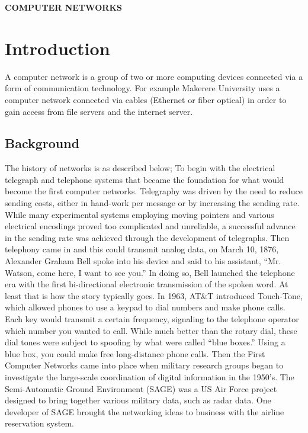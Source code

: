 ﻿\documentclass[10]{article}
\begin{document}
\begin{title}
\huge{\bfseries COMPUTER NETWORKS}
\end{title}
\author{BAMUZIBIRE SOLOMON MUKISA,14/U/3938/PS,214015782}
\section{Introduction}
A computer network is a group of two or more computing devices connected via a form of communication technology. For example Makerere University uses a computer network connected via cables (Ethernet or fiber optical) in order to gain access from file servers and the internet server.
\subsection{Background}
The history of networks is as described below;
To begin with the electrical telegraph and telephone systems that became the foundation for what would become the first computer networks. Telegraphy was driven by the need to reduce sending costs, either in hand-work per message or by increasing the sending rate. While many experimental systems employing moving pointers and various electrical encodings proved too complicated and unreliable, a successful advance in the sending rate was achieved through the development of telegraphs. Then telephony came in and this could transmit analog data, on March 10, 1876, Alexander Graham Bell spoke into his device and said to his assistant, “Mr. Watson, come here, I want to see you.” In doing so, Bell launched the telephone era with the first bi-directional electronic transmission of the spoken word. At least that is how the story typically goes. In 1963, AT&T introduced Touch-Tone, which allowed phones to use a keypad to dial numbers and make phone calls. Each key would transmit a certain frequency, signaling to the telephone operator which number you wanted to call. While much better than the rotary dial, these dial tones were subject to spoofing by what were called “blue boxes.” Using a blue box, you could make free long-distance phone calls. Then the First Computer Networks came into place when military research groups began to investigate the large-scale coordination of digital information in the 1950’s. The Semi-Automatic Ground Environment (SAGE) was a US Air Force project designed to bring together various military data, such as radar data. One developer of SAGE brought the networking ideas to business with the airline reservation system.
\end{document}
